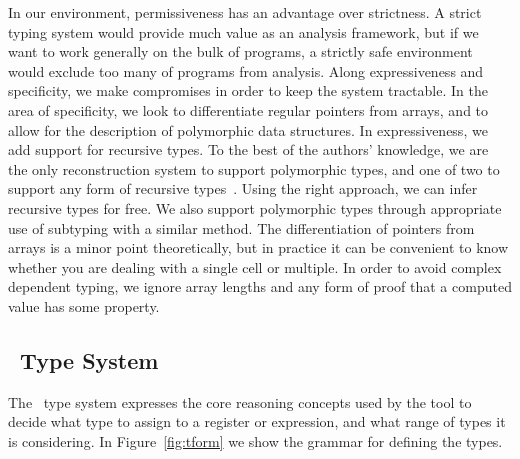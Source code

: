 In our environment, permissiveness has an advantage over strictness. A strict typing system would provide much value as an analysis framework, but if we want to work generally on the bulk of programs, a strictly safe environment would exclude too many of programs from analysis. Along expressiveness and specificity, we make compromises in order to keep the system tractable. In the area of specificity, we look to differentiate regular pointers from arrays, and to allow for the description of polymorphic data structures. In expressiveness, we add support for recursive types. To the best of the authors' knowledge, we are the only reconstruction system to support polymorphic types, and one of two to support any form of recursive types~\cite{sw}. Using the right approach, we can infer recursive types for free. We also support polymorphic types through appropriate use of subtyping with a similar method. The differentiation of pointers from arrays is a minor point theoretically, but in practice it can be convenient to know whether you are dealing with a single cell or multiple. In order to avoid complex dependent typing, we ignore array lengths and any form of proof that a computed value has some property.

\subsection{\bitr\ Type System}
\label{subsec:typesys}
The \bitr\ type system expresses the core reasoning concepts used by the tool to decide what type to assign to a register or expression, and what range of types it is considering. In Figure~\ref{fig:tform} we show the grammar for defining the types.

